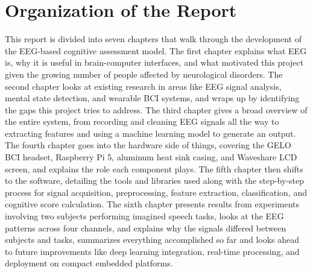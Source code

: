 \section{Organization of the Report}
This report is divided into seven chapters that walk through the development of the EEG-based cognitive assessment model. The first chapter explains what EEG is, why it is useful in brain-computer interfaces, and what motivated this project given the growing number of people affected by neurological disorders. The second chapter looks at existing research in areas like EEG signal analysis, mental state detection, and wearable BCI systems, and wraps up by identifying the gaps this project tries to address. The third chapter gives a broad overview of the entire system, from recording and cleaning EEG signals all the way to extracting features and using a machine learning model to generate an output. The fourth chapter goes into the hardware side of things, covering the GELO BCI headset, Raspberry Pi 5, aluminum heat sink casing, and Waveshare LCD screen, and explains the role each component plays. The fifth chapter then shifts to the software, detailing the tools and libraries used along with the step-by-step process for signal acquisition, preprocessing, feature extraction, classification, and cognitive score calculation. The sixth chapter presents results from experiments involving two subjects performing imagined speech tasks, looks at the EEG patterns across four channels, and explains why the signals differed between subjects and tasks, summarizes everything accomplished so far and looks ahead to future improvements like deep learning integration, real-time processing, and deployment on compact embedded platforms.\
